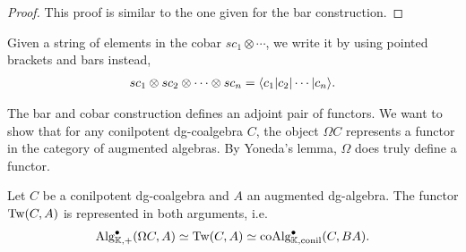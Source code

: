 \documentclass[../thesis.tex]{subfiles}
\begin{document}
            \begin{proof}
                This proof is similar to the one given for the bar construction.
            \end{proof}

            Given a string of elements in the cobar $sc_1 \otimes \cdots$, we write it by using pointed brackets and bars instead,
            \begin{align*}
                sc_1 \otimes sc_2 \otimes \cdots \otimes sc_n = \langle c_1 | c_2 | \cdots | c_n \rangle\tt{.}
            \end{align*}

            The bar and cobar construction defines an adjoint pair of functors. We want to show that for any conilpotent dg-coalgebra $C$, the object $\Omega C$ represents a functor in the category of augmented algebras. By Yoneda's lemma, $\Omega$ does truly define a functor.

            \begin{thm}\label{thm: cobar-bar-adj}
                Let $C$ be a conilpotent dg-coalgebra and $A$ an augmented dg-algebra. The functor $\tt{Tw}(C,A)$ is represented in both arguments, i.e.
                \begin{align*}
                    \tt{Alg}_{\mathbb{K},+}^\bullet(\Omega C, A)\simeq \tt{Tw}(C, A) \simeq \tt{coAlg}_{\mathbb{K},\tt{conil}}^\bullet(C, BA)\text{.}
                \end{align*}
            \end{thm}
\end{document}
